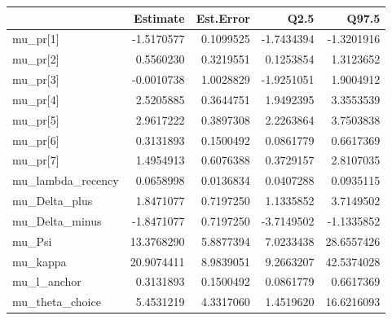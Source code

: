 
\begin{tabular}{lrrrr}
\toprule
  & Estimate & Est.Error & Q2.5 & Q97.5\\
\midrule
mu\_pr[1] & -1.5170577 & 0.1099525 & -1.7434394 & -1.3201916\\
mu\_pr[2] & 0.5560230 & 0.3219551 & 0.1253854 & 1.3123652\\
mu\_pr[3] & -0.0010738 & 1.0028829 & -1.9251051 & 1.9004912\\
mu\_pr[4] & 2.5205885 & 0.3644751 & 1.9492395 & 3.3553539\\
mu\_pr[5] & 2.9617222 & 0.3897308 & 2.2263864 & 3.7503838\\
\addlinespace
mu\_pr[6] & 0.3131893 & 0.1500492 & 0.0861779 & 0.6617369\\
mu\_pr[7] & 1.4954913 & 0.6076388 & 0.3729157 & 2.8107035\\
mu\_lambda\_recency & 0.0658998 & 0.0136834 & 0.0407288 & 0.0935115\\
mu\_Delta\_plus & 1.8471077 & 0.7197250 & 1.1335852 & 3.7149502\\
mu\_Delta\_minus & -1.8471077 & 0.7197250 & -3.7149502 & -1.1335852\\
\addlinespace
mu\_Psi & 13.3768290 & 5.8877394 & 7.0233438 & 28.6557426\\
mu\_kappa & 20.9074411 & 8.9839051 & 9.2663207 & 42.5374028\\
mu\_l\_anchor & 0.3131893 & 0.1500492 & 0.0861779 & 0.6617369\\
mu\_theta\_choice & 5.4531219 & 4.3317060 & 1.4519620 & 16.6216093\\
\bottomrule
\end{tabular}
